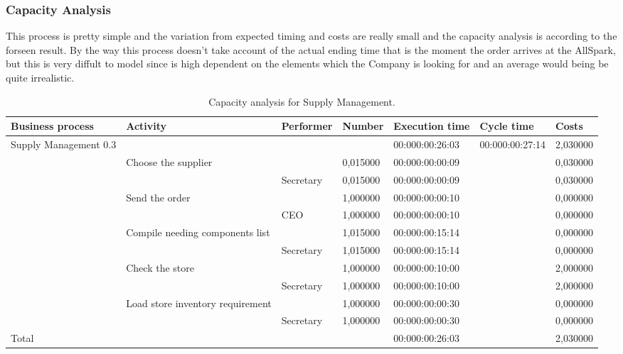 \subsubsection{Capacity Analysis}
This process is pretty simple and the variation from expected timing and costs are really small and the capacity analysis is according to the forseen result. By the way this process doesn't take account of the actual ending time that is the moment the order arrives at the AllSpark, but this is very diffult to model since is high dependent on the elements which the Company is looking for and an average would being be quite irrealistic.

\begin{landscape}
\begin{table}
\centering
{\tiny
\begin{tabular}{|l|l|l|l|l|l|l|}
Business process&Activity&Performer&Number&Execution time&Cycle time&Costs\\
\hline
Supply Management 0.3&&&&00:000:00:26:03&00:000:00:27:14&2,030000\\
\hline
&Choose the supplier &&0,015000&00:000:00:00:09&&0,030000\\
\hline
&&Secretary &0,015000&00:000:00:00:09&&0,030000\\
\hline
&Send the order &&1,000000&00:000:00:00:10&&0,000000\\
\hline
&&CEO &1,000000&00:000:00:00:10&&0,000000\\
\hline
&Compile needing components list &&1,015000&00:000:00:15:14&&0,000000\\
\hline
&&Secretary &1,015000&00:000:00:15:14&&0,000000\\
\hline
&Check the store &&1,000000&00:000:00:10:00&&2,000000\\
\hline
&&Secretary &1,000000&00:000:00:10:00&&2,000000\\
\hline
&Load store inventory requirement &&1,000000&00:000:00:00:30&&0,000000\\
\hline
&&Secretary &1,000000&00:000:00:00:30&&0,000000\\
\hline
Total&&&&00:000:00:26:03&&2,030000
\end{tabular}
}
\caption{Capacity analysis for Supply Management.}
\end{table}
\end{landscape}
%

%

